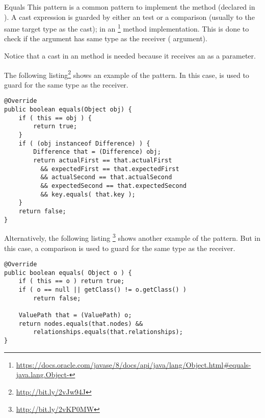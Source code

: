 \begin{pattern}{Equals}
This pattern is a common pattern to implement the  method (declared in ).
A cast expression is guarded by either an  test or a  comparison (usually to the same target type as the cast);
in an %
\footnote{\url{https://docs.oracle.com/javase/8/docs/api/java/lang/Object.html\#equals-java.lang.Object-}} method implementation.
This is done to check if the argument has same type as the receiver
( argument).

Notice that a cast in an  method is needed because it
receives an  as a parameter.

\instances{}
The following listing\footnote{\url{http://bit.ly/2vJw94J}} shows an example of the \pname{} pattern.
In this case,  is used to guard for the same type as the receiver.

\begin{verbatim}
@Override
public boolean equals(Object obj) {
    if ( this == obj ) {
        return true;
    }
    if ( (obj instanceof Difference) ) {
        Difference that = (Difference) obj;
        return actualFirst == that.actualFirst
          && expectedFirst == that.expectedFirst
          && actualSecond == that.actualSecond 
          && expectedSecond == that.expectedSecond
          && key.equals( that.key );
    }
    return false;
}
\end{verbatim}

Alternatively, the following listing%
\footnote{\url{http://bit.ly/2vKP0MW}}
shows another example of the \thisp{} pattern.
But in this case, a  comparison is used to guard for the same type as the receiver.

\begin{verbatim}
@Override
public boolean equals( Object o ) {
    if ( this == o ) return true;
    if ( o == null || getClass() != o.getClass() )
        return false;

    ValuePath that = (ValuePath) o;
    return nodes.equals(that.nodes) &&
        relationships.equals(that.relationships);
}
\end{verbatim}


\end{pattern}
